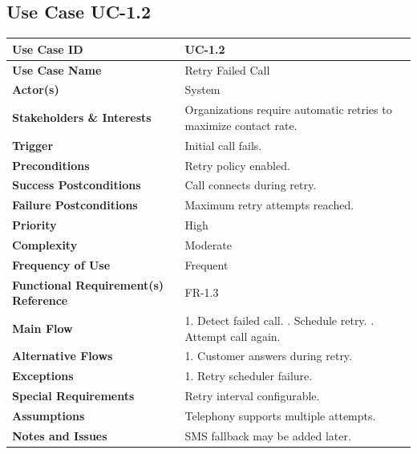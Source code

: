\documentclass[12pt,a4paper]{report}
\begin{document}
\subsection*{Use Case UC-1.2}
\begin{longtable}{|p{4cm}|p{9cm}|}
\hline
\textbf{Use Case ID} & UC-1.2 \\ \hline
\textbf{Use Case Name} & Retry Failed Call \\ \hline
\textbf{Actor(s)} & System \\ \hline
\textbf{Stakeholders \& Interests} & Organizations require automatic retries to maximize contact rate. \\ \hline
\textbf{Trigger} & Initial call fails. \\ \hline
\textbf{Preconditions} & Retry policy enabled. \\ \hline
\textbf{Success Postconditions} & Call connects during retry. \\ \hline
\textbf{Failure Postconditions} & Maximum retry attempts reached. \\ \hline
\textbf{Priority} & High \\ \hline
\textbf{Complexity} & Moderate \\ \hline
\textbf{Frequency of Use} & Frequent \\ \hline
\textbf{Functional Requirement(s) Reference} & FR-1.3 \\ \hline
\textbf{Main Flow} &
1. Detect failed call. \newline
2. Schedule retry. \newline
3. Attempt call again. \\ \hline
\textbf{Alternative Flows} &
1. Customer answers during retry. \\ \hline
\textbf{Exceptions} &
1. Retry scheduler failure. \\ \hline
\textbf{Special Requirements} &
Retry interval configurable. \\ \hline
\textbf{Assumptions} &
Telephony supports multiple attempts. \\ \hline
\textbf{Notes and Issues} &
SMS fallback may be added later. \\ \hline
\end{longtable}

\end{document}
